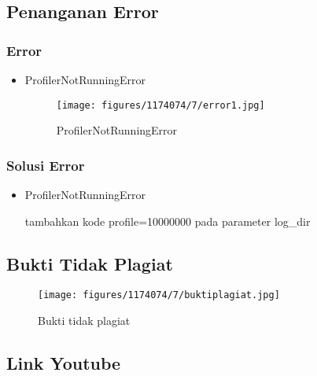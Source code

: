 \subsection{Penanganan Error}
\subsubsection{Error}
\hfill\break
\begin{itemize}
\item ProfilerNotRunningError

\begin{figure}[H]
\centering
	\texttt{[image: figures/1174074/7/error1.jpg]}
\caption{ProfilerNotRunningError}
\end{figure}
\end{itemize}
\subsubsection{Solusi Error}
\hfill\break
\begin{itemize}
\item ProfilerNotRunningError

tambahkan kode profile=10000000 pada parameter log\_dir
\end{itemize}

\subsection{Bukti Tidak Plagiat}
\begin{figure}[H]
	\texttt{[image: figures/1174074/7/buktiplagiat.jpg]}
	\centering
	\caption{Bukti tidak plagiat}
\end{figure}

\subsection{Link Youtube}
